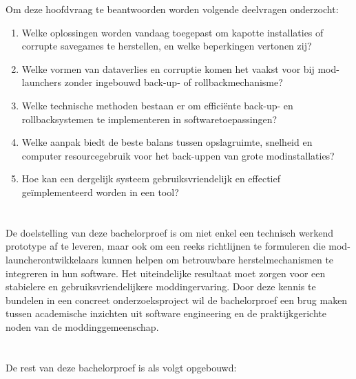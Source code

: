 Om deze hoofdvraag te beantwoorden worden volgende deelvragen onderzocht:

\begin{enumerate}
    \item Welke oplossingen worden vandaag toegepast om kapotte installaties of corrupte savegames te herstellen, en welke beperkingen vertonen zij?
    
    \item Welke vormen van dataverlies en corruptie komen het vaakst voor bij mod-launchers zonder ingebouwd back-up- of rollbackmechanisme?
    
    \item Welke technische methoden bestaan er om efficiënte back-up- en rollbacksystemen te implementeren in softwaretoepassingen?
    
    \item Welke aanpak biedt de beste balans tussen opslagruimte, snelheid en computer resourcegebruik voor het back-uppen van grote modinstallaties?
    
    \item Hoe kan een dergelijk systeem gebruiksvriendelijk en effectief geïmplementeerd worden in een tool?
\end{enumerate}

\section{}%
\label{sec:onderzoeksdoelstelling}

De doelstelling van deze bachelorproef is om niet enkel een technisch werkend prototype af te leveren, maar ook om een reeks richtlijnen te formuleren die mod-launcherontwikkelaars kunnen helpen om betrouwbare herstelmechanismen te integreren in hun software. Het uiteindelijke resultaat moet zorgen voor een stabielere en gebruiksvriendelijkere moddingervaring. Door deze kennis te bundelen in een concreet onderzoeksproject wil de bachelorproef een brug maken tussen academische inzichten uit software engineering en de praktijkgerichte noden van de moddinggemeenschap.

\section{}%
\label{sec:opzet-bachelorproef}

De rest van deze bachelorproef is als volgt opgebouwd:

